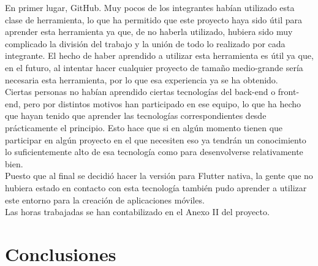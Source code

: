 \documentclass{article}
\begin{document}
\hfill \break
En primer lugar, GitHub. Muy pocos de los integrantes habían utilizado esta clase de herramienta, lo que ha permitido que este proyecto haya sido útil para aprender esta herramienta ya que, de no haberla utilizado, hubiera sido muy complicado la división del trabajo y la unión de todo lo realizado por cada integrante. El hecho de haber aprendido a utilizar esta herramienta es útil ya que, en el futuro, al intentar hacer cualquier proyecto de tamaño medio-grande sería necesaria esta herramienta, por lo que esa experiencia ya se ha obtenido.\\
\hfill \break
Ciertas personas no habían aprendido ciertas tecnologías del back-end o front-end, pero por distintos motivos han participado en ese equipo, lo que ha hecho que hayan tenido que aprender las tecnologías correspondientes desde prácticamente el principio. Esto hace que si en algún momento tienen que participar en algún proyecto en el que necesiten eso ya tendrán un conocimiento lo suficientemente alto de esa tecnología como para desenvolverse relativamente bien. \\
\hfill \break
Puesto que al final se decidió hacer la versión para Flutter nativa, la gente que no hubiera estado en contacto con esta tecnología también pudo aprender a utilizar este entorno para la creación de aplicaciones móviles.\\
\hfill \break
Las horas trabajadas se han contabilizado en el Anexo II del proyecto.
\newpage
\section{Conclusiones}
\end{document}
